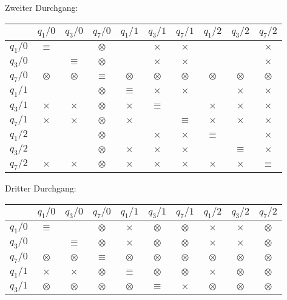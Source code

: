 \begin{loesung}
\begin{teilaufgaben}
Zweiter Durchgang:
\begin{center}
\begin{tabular}{|c|ccccccccc|}
\hline
         &$q_1/0$  &$q_3/0$  &$q_7/0$  &$q_1/1$  &$q_3/1$  &$q_7/1$  &$q_1/2$  &$q_3/2$  &$q_7/2$  \\
\hline
$q_1/0$  &$\equiv$ &         &$\otimes$&         &$\times$ &$\times$ &         &         &$\times$ \\
$q_3/0$  &         &$\equiv$ &$\otimes$&         &$\times$ &$\times$ &         &         &$\times$ \\
$q_7/0$  &$\otimes$&$\otimes$&$\equiv$ &$\otimes$&$\otimes$&$\otimes$&$\otimes$&$\otimes$&$\otimes$\\
$q_1/1$  &         &         &$\otimes$&$\equiv$ &$\times$ &$\times$ &         &$\times$ &$\times$ \\
$q_3/1$  &$\times$ &$\times$ &$\otimes$&$\times$ &$\equiv$ &         &$\times$ &$\times$ &$\times$ \\
$q_7/1$  &$\times$ &$\times$ &$\otimes$&$\times$ &         &$\equiv$ &$\times$ &$\times$ &$\times$ \\
$q_1/2$  &         &         &$\otimes$&         &$\times$ &$\times$ &$\equiv$ &         &$\times$ \\
$q_3/2$  &         &         &$\otimes$&$\times$ &$\times$ &$\times$ &         &$\equiv$ &$\times$ \\
$q_7/2$  &$\times$ &$\times$ &$\otimes$&$\times$ &$\times$ &$\times$ &$\times$ &$\times$ &$\equiv$ \\
\hline
\end{tabular}
\end{center}
Dritter Durchgang:
\begin{center}
\begin{tabular}{|c|ccccccccc|}
\hline
         &$q_1/0$  &$q_3/0$  &$q_7/0$  &$q_1/1$  &$q_3/1$  &$q_7/1$  &$q_1/2$  &$q_3/2$  &$q_7/2$  \\
\hline
$q_1/0$  &$\equiv$ &         &$\otimes$&$\times$ &$\otimes$&$\otimes$&$\times$ &$\times$ &$\otimes$\\
$q_3/0$  &         &$\equiv$ &$\otimes$&$\times$ &$\otimes$&$\otimes$&$\times$ &$\times$ &$\otimes$\\
$q_7/0$  &$\otimes$&$\otimes$&$\equiv$ &$\otimes$&$\otimes$&$\otimes$&$\otimes$&$\otimes$&$\otimes$\\
$q_1/1$  &$\times$ &$\times$ &$\otimes$&$\equiv$ &$\otimes$&$\otimes$&$\times$ &$\otimes$&$\otimes$\\
$q_3/1$  &$\otimes$&$\otimes$&$\otimes$&$\otimes$&$\equiv$ &$\times$ &$\otimes$&$\otimes$&$\otimes$\\

\end{tabular}
\end{center}
\end{teilaufgaben}
\end{loesung}
